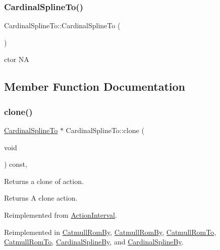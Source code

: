 \subsubsection{\texorpdfstring{Cardinal\+Spline\+To()}{CardinalSplineTo()}\hspace{0.1cm}{\footnotesize\ttfamily [2/2]}}
{\footnotesize\ttfamily Cardinal\+Spline\+To\+::\+Cardinal\+Spline\+To (\begin{DoxyParamCaption}{ }\end{DoxyParamCaption})}

ctor  NA 

\subsection{Member Function Documentation}
\mbox{\label{classCardinalSplineTo_aed2a776edc3e26b2ba7524230edf42de}} 
\subsubsection{\texorpdfstring{clone()}{clone()}\hspace{0.1cm}{\footnotesize\ttfamily [1/2]}}
{\footnotesize\ttfamily \hyperlink{classCardinalSplineTo}{Cardinal\+Spline\+To} $\ast$ Cardinal\+Spline\+To\+::clone (\begin{DoxyParamCaption}\item[{void}]{ }\end{DoxyParamCaption}) const\hspace{0.3cm}{\ttfamily [override]}, {\ttfamily [virtual]}}

Returns a clone of action.

\begin{DoxyReturn}{Returns}
A clone action. 
\end{DoxyReturn}


Reimplemented from \hyperlink{classActionInterval_abc93ce0c2f54a90eb216a7803f25f44a}{Action\+Interval}.



Reimplemented in \hyperlink{classCatmullRomBy_aea28e624bd562521e444af38384470aa}{Catmull\+Rom\+By}, \hyperlink{classCatmullRomBy_a972f2e516b44eaa141ae270f575024e5}{Catmull\+Rom\+By}, \hyperlink{classCatmullRomTo_afa8df104554278343334dfa497cc1526}{Catmull\+Rom\+To}, \hyperlink{classCatmullRomTo_ac06c19763c7b07903f19178f94694541}{Catmull\+Rom\+To}, \hyperlink{classCardinalSplineBy_abe6e897500669708f01d42fd97226a02}{Cardinal\+Spline\+By}, and \hyperlink{classCardinalSplineBy_a35b00381b2823644533fd485817b147e}{Cardinal\+Spline\+By}.


